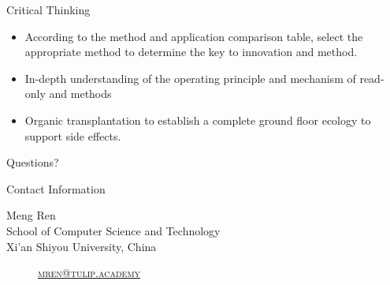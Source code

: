 \documentclass[
 size=14pt,
 paper=smartboard,  %
 mode=present, 		%
 display=slides, 	%
 style=tuliplab,  	%
 pauseslide,
 fleqn,leqno]{powerdot}{}
\begin{document}
\begin{slide}[toc=,bm=]{Critical Thinking}

\begin{itemize}
  \item According to the method and application comparison table, select the appropriate method to determine the key to innovation and method.
  \item In-depth understanding of the operating principle and mechanism of read-only and methods
  \item Organic transplantation to establish a complete ground floor ecology to support side effects.
\end{itemize}

\end{slide}

%
\begin{slide}[toc=,bm=]{Questions?}
\begin{center}
\begin{figure}
\end{figure}
\end{center}
\end{slide}

\begin{wideslide}[toc=,bm=]{Contact Information}
\centering
{}
\twocolumn[
lcolwidth=0.35\linewidth,
rcolwidth=0.65\linewidth
]
{
}
{
Meng Ren\\
School of Computer Science and Technology\\
Xi'an Shiyou University, China
\begin{description}
 \item[\textcolor{orange}{\faEnvelope}] \href{mailto:mren@tulip.academy}
 {\textsc{\footnotesize{mren@tulip.academy}}}

\end{description}
}
\end{wideslide}
\end{document}
